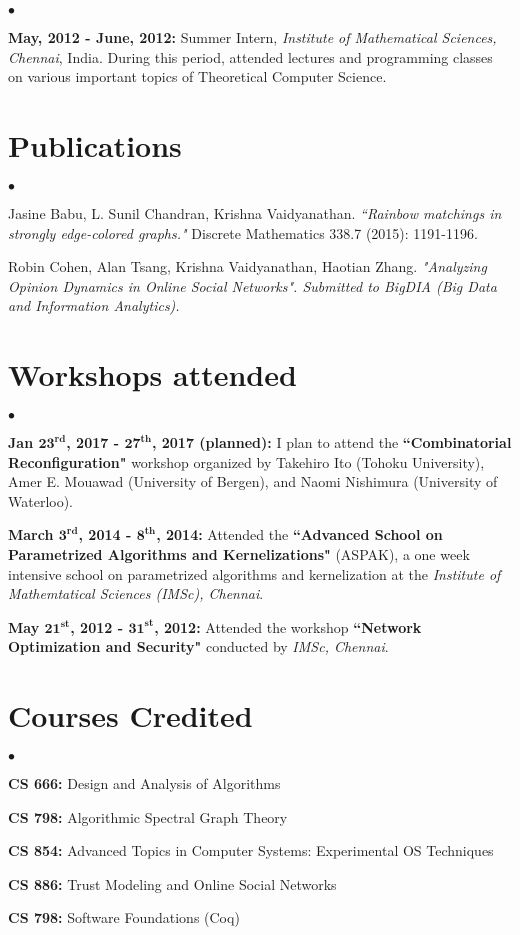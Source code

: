 \documentclass[margin,line]{res}
\newenvironment{list2}{
  \begin{list}{$\bullet$}{%
      \setlength{\itemsep}{0in}
      \setlength{\parsep}{0in} \setlength{\parskip}{0in}
      \setlength{\topsep}{0in} \setlength{\partopsep}{0in} 
      \setlength{\leftmargin}{0.2in}}}{\end{list}}
\begin{document}
\begin{resume}
\begin{list2}
\item \textbf{May, 2012 - June, 2012:} Summer Intern, \textit{Institute of Mathematical Sciences, Chennai}, India. During this period, attended lectures and programming classes on various important topics of Theoretical Computer Science.
\end{list2}

\section{\sc Publications}
\begin{list2}
\item Jasine  Babu,  L.  Sunil  Chandran, Krishna  Vaidyanathan. \textit{``Rainbow matchings in strongly edge-colored graphs."} Discrete Mathematics 338.7 (2015):  1191-1196.
\item Robin Cohen, Alan Tsang, Krishna Vaidyanathan, Haotian Zhang. 
    \textit{"Analyzing Opinion Dynamics in Online Social Networks". Submitted to 
        BigDIA (Big Data and Information Analytics).} \end{list2}

\section{\sc Workshops attended}
\begin{list2}
\item \textbf{Jan $\mathbf{23^{rd}}$, 2017 - $\mathbf{27^{th}}$, 2017 (planned):}
    I plan to attend the \textbf{``Combinatorial Reconfiguration"} workshop organized by
    Takehiro Ito (Tohoku University), Amer E. Mouawad (University of Bergen),
    and Naomi Nishimura (University of Waterloo). 
\item \textbf{March $\mathbf{3^{rd}}$, 2014 - $\mathbf{8^{th}}$, 2014:} Attended the \textbf{``Advanced School on Parametrized Algorithms and Kernelizations"} (ASPAK), a one week intensive school on parametrized algorithms and kernelization at the \textit{Institute of Mathemtatical Sciences (IMSc), Chennai}.

\item  \textbf{May $\mathbf{21^{st}}$, 2012 - $\mathbf{31^{st}}$, 2012:} Attended the workshop \textbf{``Network Optimization and Security"} conducted by \textit{IMSc, Chennai}.
\end{list2}

\section{\sc Courses Credited}
\begin{list2}
\item \textbf{CS 666:} Design and Analysis of Algorithms
\item \textbf{CS 798:} Algorithmic Spectral Graph Theory
\item \textbf{CS 854:} Advanced Topics in Computer Systems: Experimental OS Techniques
\item \textbf{CS 886:} Trust Modeling and Online Social Networks
\item \textbf{CS 798:} Software Foundations (Coq)
\end{list2}

\end{resume}
\end{document}
